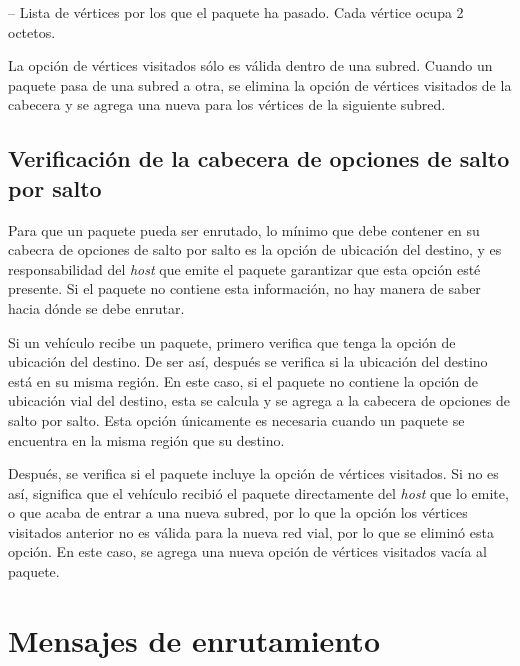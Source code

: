  -- Lista de vértices por los
que el paquete ha pasado. Cada vértice ocupa 2 octetos.

La opción de vértices visitados sólo es válida dentro de una subred. Cuando un
paquete pasa de una subred a otra, se elimina la opción de vértices visitados
de la cabecera y se agrega una nueva para los vértices de la siguiente subred.

\subsection{Verificación de la cabecera de opciones de salto por salto}
\label{subsec:verificacion_cabecera_opciones_salto_por_salto}

Para que un paquete pueda ser enrutado, lo mínimo que debe contener en su
cabecra de opciones de salto por salto es la opción de ubicación del destino, y
es responsabilidad del \textit{host} que emite el paquete garantizar que esta
opción esté presente. Si el paquete no contiene esta información, no hay manera
de saber hacia dónde se debe enrutar.

Si un vehículo recibe un paquete, primero verifica que tenga la opción de
ubicación del destino. De ser así, después se verifica si la ubicación del
destino está en su misma región. En este caso, si el paquete no contiene la
opción de ubicación vial del destino, esta se calcula y se agrega a la cabecera
de opciones de salto por salto. Esta opción únicamente es necesaria cuando un
paquete se encuentra en la misma región que su destino.

Después, se verifica si el paquete incluye la opción de vértices visitados. Si
no es así, significa que el vehículo recibió el paquete directamente del
\textit{host} que lo emite, o que acaba de entrar a una nueva subred, por lo que
la opción los vértices visitados anterior no es válida para la nueva red vial,
por lo que se eliminó esta opción. En este caso, se agrega una nueva opción de
vértices visitados vacía al paquete.

\section{Mensajes de enrutamiento}
\label{sec:mensajes_de_enrutamiento}

